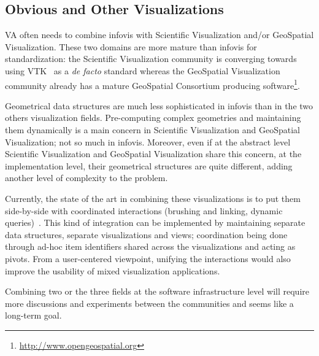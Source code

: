 \begin{comment}
 experiment on various means to carry this
community-driven consensus building, to see how it can help
consolidate acquired experience in the craft of toolkit design.


In many respects, this process is akin to a
standardization process, only it lacks the industry incentive and
backing. Like open source projects, we shall only count on voluntary
contributions (aside partial of funding from public research grants),
only, in the present state of toolkits, it is much more tempting to
devise and expand one's own toolkit than contribute and make
compromise to use a shared design which still lacks serious adoption.


As an afterthought, we find such consolidation effort is rarely found
in research domains, and yet should surely help make the field more
visible and readable from an outsider perspective.
\end{comment}

\subsection{Obvious and Other Visualizations}

VA often needs to combine infovis with Scientific
Visualization and/or GeoSpatial Visualization.  These two domains are
more mature than infovis for standardization: the Scientific
Visualization community is converging towards using VTK~\cite{VTK} as
a \textit{de facto} standard whereas the GeoSpatial Visualization
community already has a mature GeoSpatial Consortium producing
software\footnote{\url{http://www.opengeospatial.org}}.

Geometrical data structures are much less sophisticated in infovis
than in the two others visualization fields.  Pre-computing complex
geometries and maintaining them dynamically is a main concern in
Scientific Visualization and GeoSpatial Visualization; not so much in
infovis.  Moreover, even if at the abstract level Scientific
Visualization and GeoSpatial Visualization share this concern, at the
implementation level, their geometrical structures are quite
different, adding another level of complexity to the problem.

Currently, the state of the art in combining these visualizations is
to put them side-by-side with coordinated interactions (brushing and
linking, dynamic queries)~\cite{Coord3D}.  This kind of integration 
can be implemented by maintaining separate data structures, separate
visualizations and views; coordination being done through ad-hoc item
identifiers shared across the visualizations and acting as pivots.
From a user-centered viewpoint, unifying the interactions would also
improve the usability of mixed visualization applications.

Combining two or the three fields at the software infrastructure
level will require more discussions and experiments between the
communities and seems like a long-term goal.
